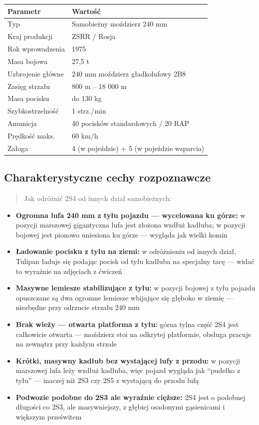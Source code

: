 \documentclass[12pt,oneside]{book}
\providecommand{\tightlist}{%
  \setlength{\itemsep}{0pt}\setlength{\parskip}{0pt}}
\begin{document}
\begin{longtable}[]{@{}ll@{}}
\toprule\noalign{}
Parametr & Wartość \\
\midrule\noalign{}
\endhead
\bottomrule\noalign{}
\endlastfoot
Typ & Samobieżny moździerz 240 mm \\
Kraj produkcji & ZSRR / Rosja \\
Rok wprowadzenia & 1975 \\
Masa bojowa & 27,5 t \\
Uzbrojenie główne & 240 mm moździerz gładkolufowy 2B8 \\
Zasięg strzału & 800 m -- 18 000 m \\
Masa pocisku & do 130 kg \\
Szybkostrzelność & 1 strz./min \\
Amunicja & 40 pocisków standardowych / 20 RAP \\
Prędkość maks. & 60 km/h \\
Załoga & 4 (w pojeździe) + 5 (w pojeździe wsparcia) \\
\end{longtable}

\subsection{Charakterystyczne cechy
rozpoznawcze}\label{charakterystyczne-cechy-rozpoznawcze-24}

\begin{quote}
Jak odróżnić 2S4 od innych dział samobieżnych:
\end{quote}

\begin{itemize}
\tightlist
\item
  \textbf{Ogromna lufa 240 mm z tyłu pojazdu --- wycelowana ku górze:} w
  pozycji marszowej gigantyczna lufa jest złożona wzdłuż kadłuba; w
  pozycji bojowej jest pionowo uniesiona ku górze --- wygląda jak wielki
  komin
\item
  \textbf{Ładowanie pocisku z tyłu na ziemi:} w odróżnieniu od innych
  dział, Tulipan ładuje się podając pocisk od tyłu kadłuba na specjalny
  tacę --- widać to wyraźnie na zdjęciach z ćwiczeń
\item
  \textbf{Masywne lemiesze stabilizujące z tyłu:} w pozycji bojowej z
  tyłu pojazdu opuszczane są dwa ogromne lemiesze wbijające się głęboko
  w ziemię --- niezbędne przy odrzucie strzału 240 mm
\item
  \textbf{Brak wieży --- otwarta platforma z tyłu:} górna tylna część
  2S4 jest całkowicie otwarta --- moździerz stoi na odkrytej platformie,
  obsługa pracuje na zewnątrz przy każdym strzale
\item
  \textbf{Krótki, masywny kadłub bez wystającej lufy z przodu:} w
  pozycji marszowej lufa leży wzdłuż kadłuba, więc pojazd wygląda jak
  ``pudełko z tyłu'' --- inaczej niż 2S3 czy 2S5 z wystającą do przodu
  lufą
\item
  \textbf{Podwozie podobne do 2S3 ale wyraźnie cięższe:} 2S4 jest o
  podobnej długości co 2S3, ale masywniejszy, z głębiej osadonymi
  gąsienicami i większym prześwitem
\end{itemize}
\end{document}
